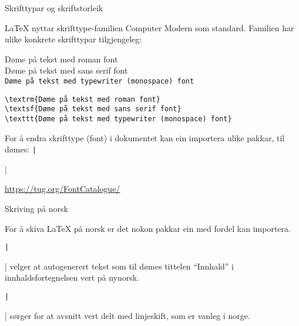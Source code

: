 	\begin{frame}[containsverbatim]{Skrifttypar og skriftstorleik}
	
\LaTeX{} nyttar skrifttype-familien Computer Modern som standard. Familien har ulike konkrete skrifttypar tilgjengeleg:
	
\textrm{Døme på tekst med roman font}\\
\textsf{Døme på tekst med sans serif font}\\
\texttt{Døme på tekst med typewriter (monospace) font}

	\begin{verbatim}
\textrm{Døme på tekst med roman font}
\textsf{Døme på tekst med sans serif font}
\texttt{Døme på tekst med typewriter (monospace) font}
	\end{verbatim}
	
	For å endra skrifttype (font) i dokumentet kan ein importera ulike pakkar, til dømes: \texttt|\usepackage{tgbonum}|
	
	\url{https://tug.org/FontCatalogue/}
	
	
\end{frame}

\begin{frame}{Skriving på norsk}
	
	For å skiva \LaTeX{} på norsk er det nokon pakkar ein med fordel kan importera.
	
	\texttt|\usepackage[nynorsk]{babel}| velger at autogenerert tekst som til dømes tittelen ``Innhald'' i innhaldsfortegnelsen vert på nynorsk.
	
	\texttt|\usepackage{parskip}| sørger for at avsnitt vert delt med linjeskift, som er vanleg i norge.
	
\end{frame}

